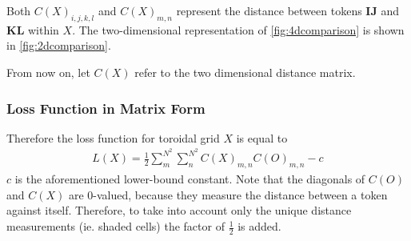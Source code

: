 Both $C(X)_{i,j,k,l}$ and $C(X)_{m,n}$ represent the distance between tokens $\bm{IJ}$ and $\bm{KL}$ within $X$. The two-dimensional representation of \autoref{fig:4dcomparison} is shown in \autoref{fig:2dcomparison}.

From now on, let $C(X)$ refer to the two dimensional distance matrix.

\subsubsection{Loss Function in Matrix Form}%
\label{ssub:loss_function_as_matrix_multiplications}
Therefore the loss function for toroidal grid $X$ is equal to
\begin{align*}
    L(X)=\frac{1}{2}\sum_m^{N^2}\sum_n^{N^2}C(X)_{m,n}C(O)_{m,n}-c
\end{align*}
$c$ is the aforementioned lower-bound constant. Note that the diagonals of $C(O)$ and $C(X)$ are 0-valued, because they measure the distance between a token against itself. Therefore, to take into account only the unique distance measurements (ie. shaded cells) the factor of $\frac{1}{2}$ is added.
